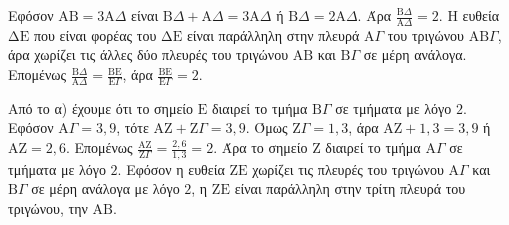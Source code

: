 \begin{alist}
    \item Εφόσον $\mathrm{AB} = 3\mathrm{A}\Delta$ είναι $\mathrm{B}\Delta + \mathrm{A}\Delta = 3\mathrm{A}\Delta$ ή $\mathrm{B}\Delta = 2\mathrm{A}\Delta$. Άρα $\frac{\mathrm{B}\Delta}{\mathrm{A}\Delta} = 2$.
    Η ευθεία $\mathrm{\Delta E}$ που είναι φορέας του $\mathrm{\Delta E}$ είναι παράλληλη στην πλευρά $\mathrm{A}\Gamma$ του τριγώνου $\mathrm{AB}\Gamma$, άρα χωρίζει τις άλλες δύο πλευρές του τριγώνου $\mathrm{AB}$ και $\mathrm{B}\Gamma$ σε μέρη ανάλογα. Επομένως $\frac{\mathrm{B}\Delta}{\mathrm{A}\Delta} = \frac{\mathrm{BE}}{\mathrm{E}\Gamma}$, άρα $\frac{\mathrm{BE}}{\mathrm{E}\Gamma} = 2$.
    \item Από το α) έχουμε ότι το σημείο $\mathrm{E}$ διαιρεί το τμήμα $\mathrm{B}\Gamma$ σε τμήματα με λόγο $2$.
    Εφόσον $\mathrm{A}\Gamma = 3,9$, τότε $\mathrm{AZ} + \mathrm{Z}\Gamma = 3,9$. Όμως $\mathrm{Z}\Gamma = 1,3$, άρα $\mathrm{AZ} + 1,3 = 3,9$ ή $\mathrm{AZ} = 2,6$.
    Επομένως $\frac{\mathrm{AZ}}{\mathrm{Z}\Gamma} = \frac{2,6}{1,3} = 2$. Άρα το σημείο $\mathrm{Z}$ διαιρεί το τμήμα $\mathrm{A}\Gamma$ σε τμήματα με λόγο $2$.
    Εφόσον η ευθεία $\mathrm{ZE}$ χωρίζει τις πλευρές του τριγώνου $\mathrm{A}\Gamma$ και $\mathrm{B}\Gamma$ σε μέρη ανάλογα με λόγο $2$, η $\mathrm{ZE}$ είναι παράλληλη στην τρίτη πλευρά του τριγώνου, την $\mathrm{AB}$.
\end{alist}